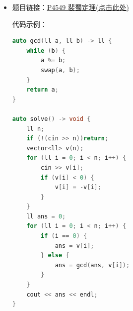 \begin{itemize}
\begin{itemize}
\item 
推广到 $n$ 个数的情况：对于序列 $A = \{A_1, A_2, \dots, A_n\}$，满足 $\sum_{i=1}^{n} A_i X_i > 0$ 的最小正整数解为：
\[ S_{\min} = \gcd(|A_1|, |A_2|, \dots, |A_n|) \]
\end{itemize}
\item 题目链接：\href{https://www.luogu.com.cn/problem/P4549}{P4549 裴蜀定理(点击此处)}

代码示例：\\
\begin{lstlisting}[language=C++]
auto gcd(ll a, ll b) -> ll {
	while (b) {
		a %= b;
		swap(a, b);
	}
	return a;
}

auto solve() -> void {
	ll n;
	if (!(cin >> n))return;
	vector<ll> v(n);
	for (ll i = 0; i < n; i++) {
		cin >> v[i];
		if (v[i] < 0) {
			v[i] = -v[i];
		}
	}
	ll ans = 0;
	for (ll i = 0; i < n; i++) {
		if (i == 0) {
			ans = v[i];
		} else {
			ans = gcd(ans, v[i]);
		}
	}
	cout << ans << endl;
}
\end{lstlisting}
\end{itemize}
\newpage

























